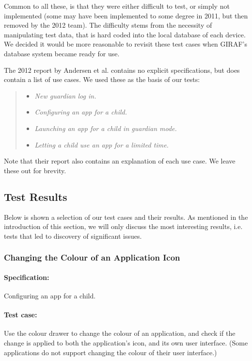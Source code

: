 Common to all these, is that they were either difficult to test, or simply not implemented (some may have been implemented to some degree in 2011, but then removed by the 2012 team). The difficulty stems from the necessity of manipulating test data, that is hard coded into the local database of each device. We decided it would be more reasonable to revisit these test cases when GIRAF's database system became ready for use.

The 2012 report by Andersen et al. \cite{launcher2012} contains no explicit specifications, but does contain a list of use cases. We used these as the basis of our tests:
\begin{quote}
\begin{itemize}
	\item \textit{New guardian log in.}
	\item \textit{Configuring an app for a child.}
	\item \textit{Launching an app for a child in guardian mode.}
	\item \textit{Letting a child use an app for a limited time.}
\end{itemize}
\end{quote}
Note that their report also contains an explanation of each use case. We leave these out for brevity.

\subsection{Test Results}
Below is shown a selection of our test cases and their results.
As mentioned in the introduction of this section, we will only discuss the most interesting results, i.e. tests that led to discovery of significant issues.

\subsubsection*{Changing the Colour of an Application Icon}
\paragraph{Specification:} Configuring an app for a child.
\paragraph{Test case:} Use the colour drawer to change the colour of an application, and check if the change is applied to both the application's icon, and its own user interface. (Some applications do not support changing the colour of their user interface.)
